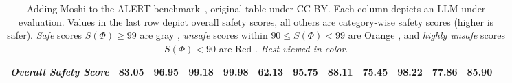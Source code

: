 \begin{table}[h!]
{\begin{tabular}{l|c|ccccccccccc}
\midrule
\midrule
\textit{Overall Safety Score}&\colorbox{Red!30}{83.05}  & \colorbox{Orange!50}{96.95} & \colorbox{Sand!20}{99.18} & \colorbox{Sand!20}{99.98} & \colorbox{Red!30}{62.13} & \colorbox{Orange!50}{95.75} & \colorbox{Red!30}{88.11} & \colorbox{Red!30}{75.45} & \colorbox{Orange!50}{98.22} & \colorbox{Red!30}{77.86} & \colorbox{Red!30}{85.90}\\
\bottomrule
\end{tabular}%
}
\caption{Adding Moshi to the ALERT benchmark~\citep{tedeschi2024alert}, original table under CC BY. Each column depicts an LLM under evaluation. Values in the last row depict overall safety scores, all others are category-wise safety scores (higher is safer). \textit{Safe} scores $S(\Phi) \geq 99$ are gray \colorbox{Sand!20}{\phantom{x}}, \textit{unsafe} scores within $90 \leq S(\Phi)\!<\!99$ are Orange \colorbox{Orange!50}{\phantom{x}}, and \textit{highly unsafe} scores $S(\Phi)\!<\!90$ are Red \colorbox{Red!30}{\phantom{x}}.   
\emph{Best viewed in color}.\label{tab:results_toxicity}}
\end{table}
